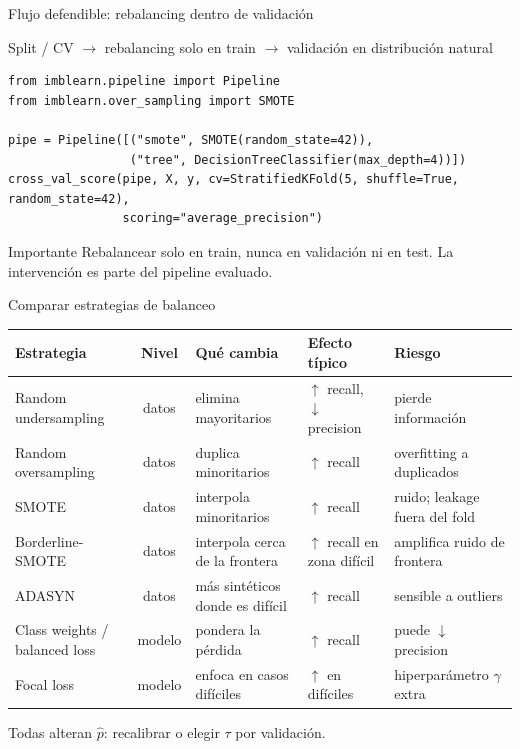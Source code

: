 \documentclass[aspectratio=169,12pt]{beamer}
\newcommand{\hrow}{\rowcolor{mlcream}}
\begin{document}
\begin{frame}[fragile]{Flujo defendible: rebalancing dentro de validación}
  \begin{center}
    Split / CV $\rightarrow$ rebalancing solo en train $\rightarrow$ validación en distribución natural
  \end{center}
\begin{lstlisting}[basicstyle=\ttfamily\scriptsize,columns=fullflexible,keepspaces=true]
from imblearn.pipeline import Pipeline
from imblearn.over_sampling import SMOTE

pipe = Pipeline([("smote", SMOTE(random_state=42)),
                 ("tree", DecisionTreeClassifier(max_depth=4))])
cross_val_score(pipe, X, y, cv=StratifiedKFold(5, shuffle=True, random_state=42),
                scoring="average_precision")
\end{lstlisting}
  \begin{alertblock}{Importante}
    Rebalancear solo en train, nunca en validación ni en test. La intervención es parte del pipeline evaluado.
  \end{alertblock}
\end{frame}

\begin{frame}{Comparar estrategias de balanceo}
  \centering\scriptsize
  \begin{tabularx}{\textwidth}{@{}L{0.2\textwidth} c >{\raggedright\arraybackslash}X >{\raggedright\arraybackslash}X >{\raggedright\arraybackslash}X@{}}
    \toprule
    \hrow \textbf{Estrategia} & Nivel & Qué cambia & Efecto típico & Riesgo \\
    \midrule
    Random undersampling & datos & elimina mayoritarios & $\uparrow$ recall, $\downarrow$ precision & pierde información \\
    Random oversampling & datos & duplica minoritarios & $\uparrow$ recall & overfitting a duplicados \\
    SMOTE & datos & interpola minoritarios & $\uparrow$ recall & ruido; leakage fuera del fold \\
    Borderline-SMOTE & datos & interpola cerca de la frontera & $\uparrow$ recall en zona difícil & amplifica ruido de frontera \\
    ADASYN & datos & más sintéticos donde es difícil & $\uparrow$ recall & sensible a outliers \\
    Class weights / balanced loss & modelo & pondera la pérdida & $\uparrow$ recall & puede $\downarrow$ precision \\
    Focal loss & modelo & enfoca en casos difíciles & $\uparrow$ en difíciles & hiperparámetro $\gamma$ extra \\
    \bottomrule
  \end{tabularx}
  \vspace{6pt}

  \raggedright\small Todas alteran $\hat{p}$: recalibrar o elegir $\tau$ por validación.
\end{frame}
\end{document}
